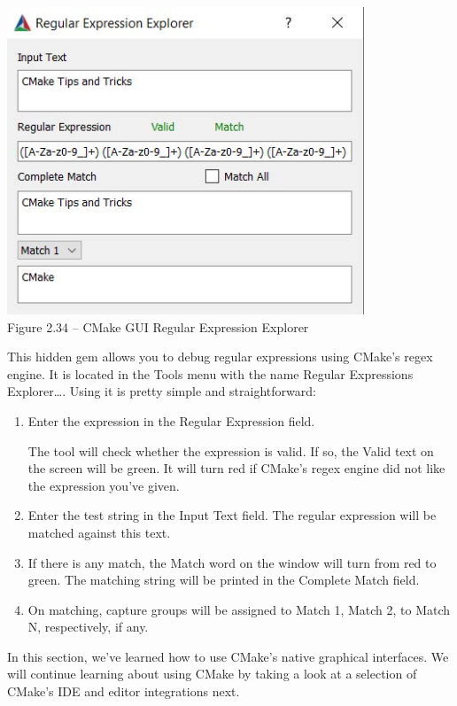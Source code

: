 \begin{center}
\includegraphics[width=0.8\textwidth]{content/1/chapter2/images/34.jpg}\\
Figure 2.34 – CMake GUI Regular Expression Explorer
\end{center}

This hidden gem allows you to debug regular expressions using CMake's regex engine. It is located in the Tools menu with the name Regular Expressions Explorer…. Using it is pretty simple and straightforward:

\begin{enumerate}
\item 
Enter the expression in the Regular Expression field.

The tool will check whether the expression is valid. If so, the Valid text on the screen will be green. It will turn red if CMake's regex engine did not like the expression you've given.

\item 
Enter the test string in the Input Text field. The regular expression will be matched against this text.

\item 
If there is any match, the Match word on the window will turn from red to green. The matching string will be printed in the Complete Match field.

\item 
On matching, capture groups will be assigned to Match 1, Match 2, to Match N, respectively, if any.
\end{enumerate}

In this section, we've learned how to use CMake's native graphical interfaces. We will continue learning about using CMake by taking a look at a selection of CMake's IDE and editor integrations next.
